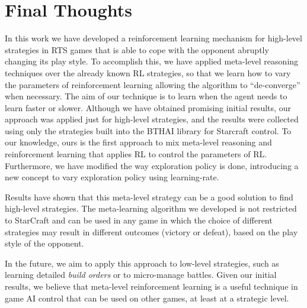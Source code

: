 \chapter{Final Thoughts}
\label{chapter:conclusion}

In this work we have developed a reinforcement learning mechanism for high-level strategies in RTS games that is able to cope with the opponent abruptly changing its play style.
To accomplish this, we have applied meta-level reasoning techniques over the already known RL strategies, so that we learn how to vary the parameters of reinforcement learning allowing the algorithm to ``de-converge'' when necessary.
The aim of our technique is to learn when the agent needs to learn faster or slower. 
Although we have obtained promising initial results, our approach was applied just for high-level strategies, and the results were collected using only the strategies built into the BTHAI library for Starcraft control.
To our knowledge, ours is the first approach to mix meta-level reasoning and reinforcement learning that applies RL to control the parameters of RL.
Furthermore, we have modified the way exploration policy is done, introducing a new concept to vary exploration policy using learning-rate.

Results have shown that this meta-level strategy can be a good solution to find high-level strategies.
The meta-learning algorithm we developed is not restricted to StarCraft and can be used in any game in which the choice of different strategies may result in different outcomes (victory or defeat), based on the play style of the opponent. 

In the future, we aim to apply this approach to low-level strategies, such as learning detailed \textit{build orders} or to micro-manage battles.
Given our initial results, we believe that meta-level reinforcement learning is a useful technique in game AI control that can be used on other games, at least at a strategic level.
